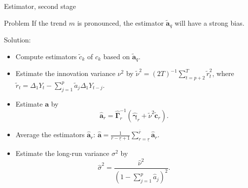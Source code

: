 \documentclass[10pt, handout]{beamer}
\begin{document}
\begin{frame}{Estimator, second stage}
\begin{block}{Problem}
If the trend $m$ is pronounced, the estimator $\widetilde{\boldsymbol{a}}_q$ will have a strong bias.
\end{block}\pause
\vspace{-2mm}
Solution:
\begin{itemize}
	\item \vspace{-2mm} Compute estimators $\widetilde{c}_k$ of $c_k$ based on $\widetilde{\boldsymbol{a}}_q$.\pause
	\item Estimate the innovation variance $\nu^2$ by $\widetilde{\nu}^2 = (2T)^{-1} \sum_{t=p+2}^T \widetilde{r}_{t}^2$, where $\widetilde{r}_{t} = \Delta_1 Y_{t} - \sum_{j=1}^p \widetilde{a}_j \Delta_1 Y_{t-j}$.\pause
	\item Estimate $\boldsymbol{a}$ by 
\begin{equation*}\label{est-AR-SS} 
\widehat{\boldsymbol{a}}_r = \widehat{\boldsymbol{\Gamma}}_r^{-1} (\widehat{\boldsymbol{\gamma}}_r + \widetilde{\nu}^2 \widetilde{\boldsymbol{c}}_r).
\end{equation*}\pause
	\item \vspace{-4mm} Average the estimators $\widehat{\boldsymbol{a}}_r$: $\widehat{\boldsymbol{a}} = \frac{1}{\overline{r} - \underline{r} + 1} \sum\limits_{r=\underline{r}}^{\overline{r}} \widehat{\boldsymbol{a}}_r$.\pause
	\item Estimate the long-run variance $\sigma^2$ by 
\begin{equation*} \label{est-lrv}
\widehat{\sigma}^2 = \frac{\widehat{\nu}^2}{(1 - \sum_{j=1}^p \widehat{a}_j)^2}. 
\end{equation*}
\end{itemize}
\end{frame}
\end{document}
